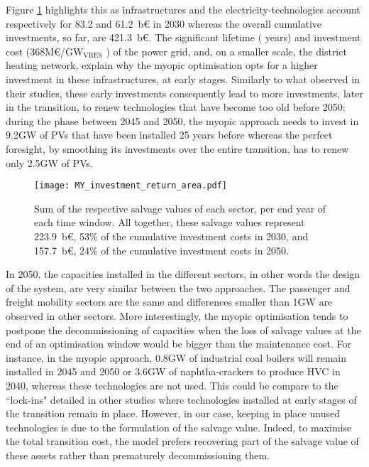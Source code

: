 Figure \ref{fig:my_pestd_inv_return_area} highlights this as infrastructures and the electricity-technologies account respectively for 83.2 and 61.2~b€ in 2030 whereas the overall cumulative investments, so far, are 421.3~b€. The significant lifetime ( years) and investment cost (\ie 368M€/GW$_\text{VRES}$ \cite{readthedocs_pathway}) of the power grid, and, on a smaller scale, the district heating network, explain why the myopic optimisation opts for a higher investment in these infrastructures, at early stages. Similarly to what \citet{keppo2010short} observed in their studies, these early investments consequently lead to more investments, later in the transition, to renew technologies that have become too old before 2050: during the phase between 2045 and 2050, the myopic approach needs to invest in 9.2GW of PVs that have been installed 25 years before whereas the perfect foresight, by smoothing its investments over the entire transition, has to renew only 2.5GW of PVs. 

\begin{figure}[!htbp]
\centering
\texttt{[image: MY\_investment\_return\_area.pdf]}
\caption{Sum of the respective salvage values of each sector, per end year of each time window. All together, these salvage values represent 223.9~b€, 53\% of the cumulative investment costs in 2030, and 157.7~b€, 24\% of the cumulative investment costs in 2050.}
\label{fig:my_pestd_inv_return_area}
\end{figure}

In 2050, the capacities installed in the different sectors, in other words the design of the system, are very similar between the two approaches. The passenger and freight mobility sectors are the same and differences smaller than 1GW are observed in other sectors. More interestingly, the myopic optimisation tends to postpone the decommissioning of capacities when the loss of salvage values at the end of an optimisation window would be bigger than the maintenance cost. For instance, in the myopic approach, 0.8GW of industrial coal boilers will remain installed in 2045 and 2050 or 3.6GW of naphtha-crackers to produce HVC in 2040, whereas these technologies are not used. This could be compare to the ``lock-ins" detailed in other studies \cite{heuberger2018impact,keppo2010short} where technologies installed at early stages of the transition remain in place. However, in our case, keeping in place unused technologies is due to the formulation of the salvage value. Indeed, to maximise the total transition cost, the model prefers recovering part of the salvage value of these assets rather than prematurely decommissioning them.

